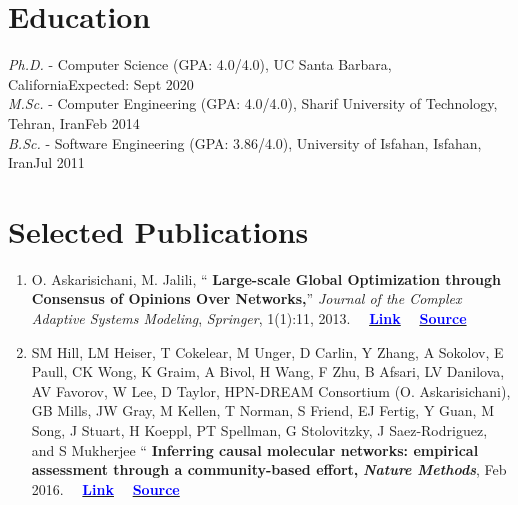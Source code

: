 \documentclass[letter]{res}
\begin{document}
	\newif \iflong
	\longfalse     %
	
	\address{+1 (805) 886 7101 ~~~ 6520 El Colegio Rd, Apt 2308, Santa Barbara, CA 93106. ~ \href{mailto:omid55@cs.ucsb.edu}{omid55@cs.ucsb.edu} ~ \href{https://scholar.google.com/citations?user=pwzmHkQAAAAJ}{GoogleScholar} ~ \href{https://www.linkedin.com/in/omid-Askarisichani-07bb5230}{LinkedIn}}
	\begin{resume}
		\noindent\makebox[\linewidth]{\rule{\paperwidth}{0.4pt}}
		
		\section{Education}
		{\sl Ph.D.} - Computer Science (GPA: 4.0/4.0), UC Santa Barbara, California\hfill Expected: Sept 2020\vspace{-1mm}\\
		{\sl M.Sc.} - Computer Engineering (GPA: 4.0/4.0), Sharif University of Technology, Tehran, Iran\hfill Feb 2014\vspace{-1mm}\\
		{\sl B.Sc.} - Software Engineering (GPA: 3.86/4.0), University of Isfahan, Isfahan, Iran\hfill Jul 2011\vspace{-1mm}
		
		\section{Selected Publications}
		\begin{enumerate}[leftmargin=-.01in]
			\item O. Askarisichani, M. Jalili, `` \textbf{Large-scale Global
				Optimization through Consensus of Opinions Over Networks,}'' \textit{Journal of the Complex Adaptive Systems Modeling}, \textit{Springer}, 1(1):11, 2013.
			~~\href{http://www.casmodeling.com/content/1/1/11}{\textbf{\textcolor{blue}{Link}}}
			~~\href{https://github.com/omid55/optimization_opinion_formation}{\textbf{\textcolor{blue}{Source}}}
			
			\item SM Hill, LM Heiser, T Cokelear, M Unger, D Carlin, Y Zhang, A Sokolov, E Paull, CK Wong, K Graim, A Bivol, H Wang, F Zhu, B Afsari, LV Danilova, AV Favorov, W Lee, D Taylor, HPN-DREAM Consortium (O. Askarisichani), GB Mills, JW Gray, M Kellen, T Norman, S Friend, EJ Fertig, Y Guan, M Song, J Stuart, H Koeppl, PT Spellman, G Stolovitzky, J Saez-Rodriguez, and S Mukherjee `` \textbf{Inferring causal molecular networks: empirical assessment through a community-based effort,} \textbf{\textit{Nature Methods}}, Feb 2016.
			~~\href{http://www.nature.com/nmeth/journal/vaop/ncurrent/full/nmeth.3773.html}{\textbf{\textcolor{blue}{Link}}}
			~~\href{https://github.com/omid55/nature_causal_network}{\textbf{\textcolor{blue}{Source}}}
			

\end{enumerate}
\end{resume}
\end{document}
